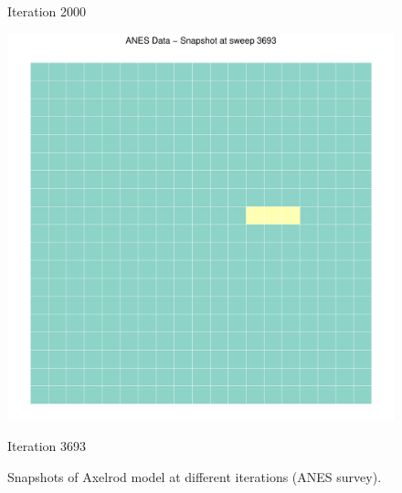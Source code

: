 \begin{figure}[htbp]
\begin{minipage}[b]{0.3\textwidth}
        \caption*{Iteration 2000}
    \end{minipage}
    \hfill
    \begin{minipage}[b]{0.3\textwidth}
        \centering
        \includegraphics[width=\textwidth]{images/Axelrod_ANES_All_Snapshots-3.pdf}
        \caption*{Iteration 3693}
    \end{minipage}
    \caption{Snapshots of Axelrod model at different iterations (ANES survey).}
    \label{ANES_plot}
\end{figure}

